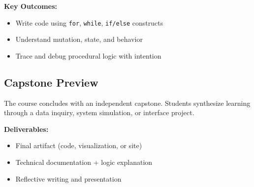 \documentclass[11pt]{article}
\begin{document}
\textbf{Key Outcomes:}
\begin{itemize}[leftmargin=*]
  \item Write code using \texttt{for}, \texttt{while}, \texttt{if/else} constructs
  \item Understand mutation, state, and behavior
  \item Trace and debug procedural logic with intention
\end{itemize}

\subsection*{Capstone Preview}
The course concludes with an independent capstone. Students synthesize learning through a data inquiry, system simulation, or interface project.

\textbf{Deliverables:}
\begin{itemize}[leftmargin=*]
  \item Final artifact (code, visualization, or site)
  \item Technical documentation + logic explanation
  \item Reflective writing and presentation
\end{itemize}
\end{document}
